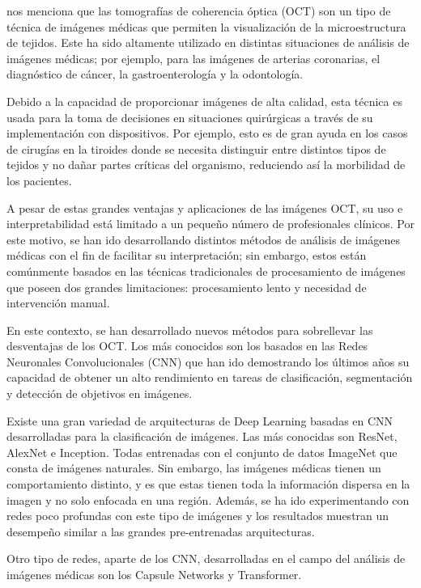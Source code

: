 \cite{pr_tampu2023diseasedthyOCT} nos menciona que las tomografías de coherencia óptica (OCT) son un tipo de técnica de imágenes médicas que permiten la visualización de la microestructura de tejidos. Este ha sido altamente utilizado en distintas situaciones de análisis de imágenes médicas; por ejemplo, para las imágenes de arterias coronarias, el diagnóstico de cáncer, la gastroenterología y la odontología.

Debido a la capacidad de proporcionar imágenes de alta calidad, esta técnica es usada para la toma de decisiones en situaciones quirúrgicas a través de su implementación con dispositivos. Por ejemplo, esto es de gran ayuda en los casos de cirugías en la tiroides donde se necesita distinguir entre distintos tipos de tejidos y no dañar partes críticas del organismo, reduciendo así la morbilidad de los pacientes.

A pesar de estas grandes ventajas y aplicaciones de las imágenes OCT, su uso e interpretabilidad está limitado a un pequeño número de profesionales clínicos. Por este motivo, se han ido desarrollando distintos métodos de análisis de imágenes médicas con el fin de facilitar su interpretación; sin embargo, estos están comúnmente basados en las técnicas tradicionales de procesamiento de imágenes que poseen dos grandes limitaciones: procesamiento lento y necesidad de intervención manual.

En este contexto, se han desarrollado nuevos métodos para sobrellevar las desventajas de los OCT. Los más conocidos son los basados en las Redes Neuronales Convolucionales (CNN) que han ido demostrando los últimos años su capacidad de obtener un alto rendimiento en tareas de clasificación, segmentación y detección de objetivos en imágenes.

Existe una gran variedad de arquitecturas de Deep Learning basadas en CNN desarrolladas para la clasificación de imágenes. Las más conocidas son ResNet, AlexNet e Inception. Todas entrenadas con el conjunto de datos ImageNet que consta de imágenes naturales. Sin embargo, las imágenes médicas tienen un comportamiento distinto, y es que estas tienen toda la información dispersa en la imagen y no solo enfocada en una región. Además, se ha ido experimentando con redes poco profundas con este tipo de imágenes y los resultados muestran un desempeño similar a las grandes pre-entrenadas arquitecturas.

Otro tipo de redes, aparte de los CNN, desarrolladas en el campo del análisis de imágenes médicas son los Capsule Networks y Transformer.


